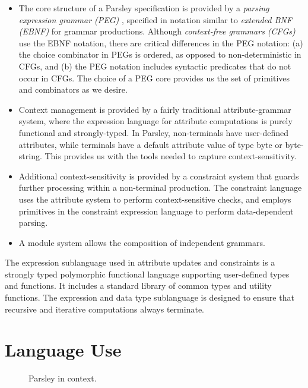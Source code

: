 \documentclass[letterpaper]{article}
\begin{document}
\begin{itemize}
\item The core structure of a Parsley specification is provided by a
  {\em parsing expression grammar (PEG)} \cite{ford2004popl},
  specified in notation similar to  {\em extended BNF (EBNF)} for
  grammar productions.  Although {\em context-free grammars (CFGs)}
  use the EBNF notation, there are critical differences in the PEG
  notation: (a) the choice combinator in PEGs is ordered, as opposed
  to non-deterministic in CFGs, and (b) the PEG notation includes
  syntactic predicates that do not occur in CFGs.  The choice of a PEG
  core provides us the set of primitives and combinators as we desire.

\item Context management is provided by a fairly traditional
  attribute-grammar system, where the expression language for
  attribute computations is purely functional and strongly-typed.  In
  Parsley, non-terminals have user-defined attributes, while terminals
  have a default attribute value of type byte or byte-string.  This
  provides us with the tools needed to capture context-sensitivity.

\item Additional context-sensitivity is provided by a constraint
  system that guards further processing  within a non-terminal production.
  The constraint language uses the attribute system to perform
  context-sensitive checks, and employs primitives in the constraint
  expression language to perform data-dependent parsing.

\item A module system allows the composition of independent grammars.
\end{itemize}

The expression sublanguage used in attribute updates and constraints
is a strongly typed polymorphic functional language supporting
user-defined types and functions.  It includes a standard library of
common types and utility functions.  The expression and data type
sublanguage is designed to ensure that recursive and iterative
computations always terminate.

\section{Language Use}
\label{s:use}

\begin{figure*}[!ht]
  \centering
  \resizebox{10cm}{!}{}
  \label{f:pipeline}
  \caption{Parsley in context.}
\end{figure*}
\end{document}
